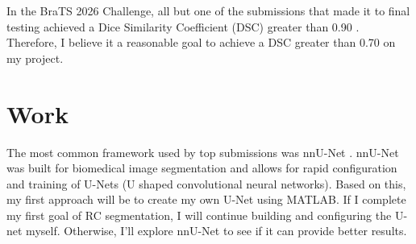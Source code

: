 \documentclass{article}
\begin{document}
In the BraTS 2026 Challenge, all but one of the submissions that made it to final testing
achieved a Dice Similarity Coefficient (DSC) greater than 0.90 \cite{JiaZhi_MultiConsortium_MICCAISAT2026}.
Therefore, I believe it a reasonable goal to achieve a DSC greater than 0.70 on my project.

\section*{Work}
The most common framework used by top submissions was nnU-Net \cite{isensee2018nnunetselfadaptingframeworkunetbased}.
nnU-Net was built for biomedical image segmentation and allows for rapid configuration
and training of U-Nets (U shaped convolutional neural networks).
Based on this, my first approach will be to create my own U-Net using MATLAB.
If I complete my first goal of RC segmentation, I will continue building and
configuring the U-net myself. Otherwise, I'll explore nnU-Net to see if it can
provide better results.



\end{document}
